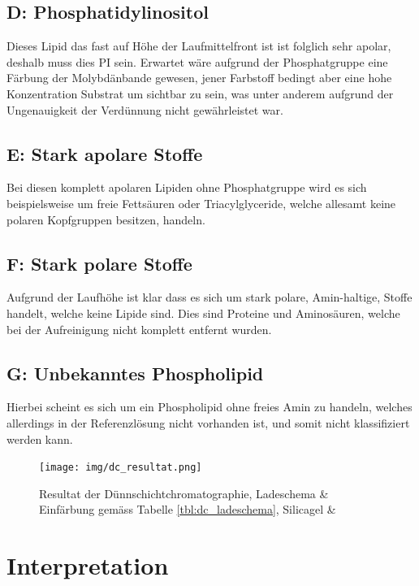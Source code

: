 \documentclass[a4paper,english]{scrreprt}
\begin{document}
\subsection{D: Phosphatidylinositol}

Dieses Lipid das fast auf Höhe der Laufmittelfront ist ist folglich sehr
apolar, deshalb muss dies PI sein. Erwartet wäre aufgrund der Phosphatgruppe
eine Färbung der Molybdänbande gewesen, jener Farbstoff bedingt aber eine hohe
Konzentration Substrat um sichtbar zu sein, was unter anderem aufgrund der
Ungenauigkeit der Verdünnung nicht gewährleistet war.

\subsection{E: Stark apolare Stoffe}

Bei diesen komplett apolaren Lipiden ohne Phosphatgruppe wird es sich
beispielsweise um freie Fettsäuren oder Triacylglyceride, welche allesamt keine
polaren Kopfgruppen besitzen, handeln.

\subsection{F: Stark polare Stoffe}

Aufgrund der Laufhöhe ist klar dass es sich um stark polare, Amin-haltige,
Stoffe handelt, welche keine Lipide sind. Dies sind Proteine und Aminosäuren,
welche bei der Aufreinigung nicht komplett entfernt wurden.

\subsection{G: Unbekanntes Phospholipid}

Hierbei scheint es sich um ein Phospholipid ohne freies Amin zu handeln,
welches allerdings in der Referenzlösung nicht vorhanden ist, und somit nicht
klassifiziert werden kann.

\begin{figure}
	\centering
	\texttt{[image: img/dc\_resultat.png]}
	\caption{Resultat der Dünnschichtchromatographie, Ladeschema \& Einfärbung gemäss Tabelle \ref{tbl:dc_ladeschema}, Silicagel \& }
	\label{fig:dc_resultat}
\end{figure}

\section{Interpretation}
\end{document}
